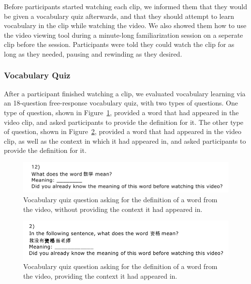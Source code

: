 \documentclass{sigchi}
\begin{document}
Before participants started watching each clip, we
informed them that they would be given a vocabulary
quiz afterwards, and that they should attempt to learn vocabulary
in the clip while watching the video. We also
showed them how to use the video viewing tool
during a minute-long familiarization session on a seperate clip
before the session. Participants were told 
they could watch the clip for as long as they
needed, pausing and rewinding as they desired.

\subsubsection{Vocabulary Quiz}

After a participant finished watching a clip, we evaluated vocabulary learning via an 18-question free-response vocabulary quiz, with two types of questions. One type of question, shown in Figure~\ref{fig:figure4}, provided a word that had appeared in the video clip, and asked participants to provide the definition for it. The other type of question, shown in Figure~\ref{fig:figure5}, provided a word that had appeared in the video clip, as well as the context in which it had appeared in, and asked participants to provide the definition for it.

\begin{figure}[!h]
\centering
\includegraphics[width=\columnwidth]{vocab-quiz-1}
\caption{Vocabulary quiz question asking for the definition
of a word from the video, without providing the context it had appeared in.}
\label{fig:figure4}
\end{figure}

\begin{figure}[!h]
\centering
\includegraphics[width=\columnwidth]{vocab-quiz-2}
\caption{Vocabulary quiz question asking for the definition
of a word from the video, providing the context it had appeared in.}
\label{fig:figure5}
\end{figure}
\end{document}
